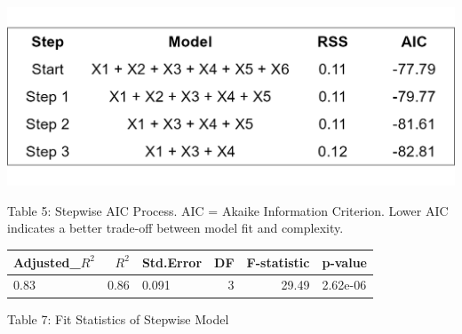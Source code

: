 \documentclass[
  12pt,
]{article}
\begin{document}
\begin{minipage}{0.48\textwidth}
\centering
\includegraphics[width=\linewidth]{figures/stepwise_aic_table.png}
\vspace{-2em}
\parbox{\linewidth}{\fontsize{12}{14}\selectfont Table 5: Stepwise AIC Process. AIC = Akaike Information Criterion. Lower AIC indicates a better trade-off between model fit and complexity.}
\end{minipage}
\hfill
{}
\addtocounter{table}{2}
\vspace{0.3em}

\begin{table}[!h]
\centering\begingroup\fontsize{8}{10}\selectfont

\begin{tabular}{lrlrrl}
\toprule
Adjusted\_$R^{2}$ & $R^2$ & Std.Error & DF & F-statistic & p-value\\
\midrule
0.83 & 0.86 & 0.091 & 3 & 29.49 & 2.62e-06\\
\bottomrule
\end{tabular}
\endgroup{}
\end{table}
\vspace{-0.5em}
\begin{center}
{\fontsize{12}{14}\selectfont Table 7: Fit Statistics of Stepwise Model\par}
\end{center}
\vspace{0.5em}
\end{document}
